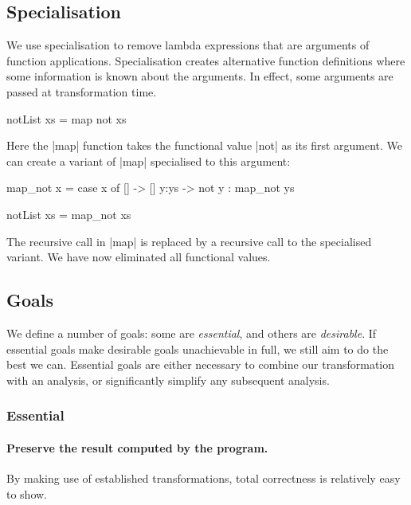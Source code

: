 \documentclass{sigplanconf}
\begin{document}
\subsection{Specialisation}

We use specialisation to remove lambda expressions that are arguments of function applications. Specialisation creates alternative function definitions where some information is known about the arguments. In effect, some arguments are passed at transformation time.

\begin{example}
\begin{code}
notList xs = map not xs
\end{code}

\noindent Here the |map| function takes the functional value |not| as its first argument. We can create a variant of |map| specialised to this argument:

\begin{code}
map_not x = case  x of
                  []    -> []
                  y:ys  -> not y : map_not ys

notList xs = map_not xs
\end{code}

\noindent The recursive call in |map| is replaced by a recursive call to the specialised variant. We have now eliminated all functional values.
\end{example}

\subsection{Goals}
\label{sec:goals}

We define a number of goals: some are \textit{essential}, and others are \textit{desirable}. If essential goals make desirable goals unachievable in full, we still aim to do the best we can. Essential goals are either necessary to combine our transformation with an analysis, or significantly simplify any subsequent analysis.

\subsubsection*{Essential}

\paragraph{Preserve the result computed by the program.} By making use of established transformations, total correctness is relatively easy to show.
\end{document}
